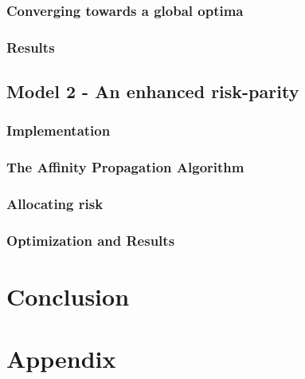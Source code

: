 \documentclass[12pt]{article} %
\numberwithin{equation}{subsection}
\begin{document}


\subsubsection{Converging towards a global optima}



\subsubsection{Results}



\subsection{Model 2 - An enhanced risk-parity}



\subsubsection{Implementation}




\subsubsection{The Affinity Propagation Algorithm}



\subsubsection{Allocating risk}



\subsubsection{Optimization and Results}




\section{Conclusion}



\newpage 


\section*{Appendix}
\end{document}
